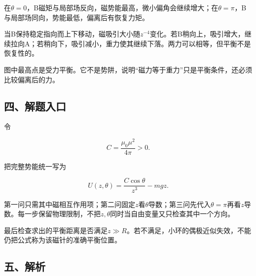 \documentclass[12pt,a4paper,fontset=fandol]{ctexart}
\begin{document}
在\(\theta=0\)，B磁矩与局部场反向，磁势能最高，微小偏角会继续增大；在\(\theta=\pi\)，B与局部场同向，势能最低，偏离后有恢复力矩。

当B保持稳定指向而上下移动，磁吸引大小随\(z^{-4}\)变化。若B稍向上，吸引增大，继续拉向A；若稍向下，吸引减小，重力使其继续下落。两力可以相等，但平衡不是恢复性的。

\begin{center}
\begin{minipage}{\linewidth}
\centering\begingroup{}
\ifdim\wd\diagrambox>.88\linewidth
\sbox{\diagrambox}{\resizebox{.88\linewidth}{!}{\usebox{\diagrambox}}}\fi
\ifdim\ht\diagrambox>.38\textheight
\resizebox{!}{.38\textheight}{\usebox{\diagrambox}}
\else\usebox{\diagrambox}\fi
\par{}\endgroup\end{minipage}\end{center}

图中最高点是受力平衡。它不是势阱，说明``磁力等于重力''只是平衡条件，还必须比较偏离后的力。

\subsection{四、解题入口}\label{ux56dbux89e3ux9898ux5165ux53e3-3}

令

\[
C=\frac{\mu_0\mu^2}{4\pi}>0.
\]

把完整势能统一写为

\[
U(z,\theta)=\frac{C\cos\theta}{z^3}-mgz.
\]

第一问只需其中磁相互作用项；第二问固定\(z\)看\(\theta\)导数；第三问先代入\(\theta=\pi\)再看\(z\)导数。每一步保留物理限制，不把\(z,\theta\)同时当自由变量又只检查其中一个方向。

最后检查求出的平衡距离是否满足\(z\gg R\)。若不满足，小环的偶极近似失效，不能仍把公式称为该磁针的准确平衡位置。

\subsection{五、解析}\label{ux4e94ux89e3ux6790-3}
\end{document}
